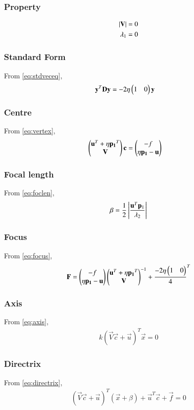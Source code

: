 \documentclass[journal,12pt,twocolumn]{IEEEtran}
\begin{document}
\subsubsection{Property}
\begin{align}
    \left\vert\mathbf{V}\right\vert = 0
    \\
    \lambda_1=0
\end{align}
\subsubsection{Standard Form}
From \eqref{eq:stdveceq},
\begin{align}
    \mathbf{y}^T\mathbf{D}\mathbf{y} &= -2\eta\begin{pmatrix}1 & 0\end{pmatrix}\mathbf{y} 
\end{align}
\subsubsection{Centre}
From \eqref{eq:vertex},
\begin{align}
    \begin{pmatrix}\mathbf{u}^T + \eta\mathbf{p_1}^T \\ \mathbf{V}\end{pmatrix}\mathbf{c} &= \begin{pmatrix}-f \\ \eta\mathbf{p_1} - \mathbf{u}\end{pmatrix} 
\end{align}
\subsubsection{Focal length}
From \eqref{eq:foclen},
\begin{align}
\beta = \frac{1}{2}\left\vert\frac{\mathbf{u}^T\mathbf{p}_1}{\lambda_2}\right\vert 
\end{align}
\subsubsection{Focus}
From \eqref{eq:focus},
\begin{align}
\mathbf{F} = \begin{pmatrix}-f \\ \eta\mathbf{p_1} - \mathbf{u}\end{pmatrix}{\ensuremath{\begin{pmatrix}\mathbf{u}^T + \eta\mathbf{p_1}^T \\ \mathbf{V}\end{pmatrix}}}^{-1} + {\frac{-2\eta\begin{pmatrix}1 & 0\end{pmatrix}}{4}}^{T} 
\end{align}
\subsubsection{Axis}
From \eqref{eq:axis},
\begin{align}
    k(\vec{V}\vec{c}+\vec{u})^{T}\vec{x} = 0 
\end{align}
\subsubsection{Directrix}
From \eqref{eq:directrix},
\begin{align}
    (\vec{V}\vec{c}+\vec{u})^T(\vec{x} +\beta) + \vec{u}^T\vec{c} + \vec{f} = 0
\end{align}
\end{document}
